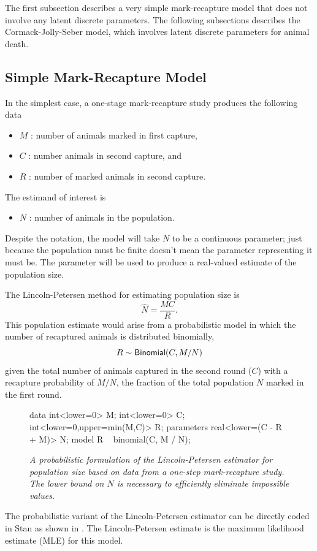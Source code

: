 The first subsection describes a very simple mark-recapture model that does
not involve any latent discrete parameters.  The following subsections
describes the Cormack-Jolly-Seber model, which involves latent
discrete parameters for animal death.

\subsection{Simple Mark-Recapture Model}

In the simplest case, a one-stage mark-recapture study produces the
following data
%
\begin{itemize}
\item $M$ : number of animals marked in first capture,
\item $C$ : number animals in second capture, and
\item $R$ : number of marked animals in second capture.
\end{itemize}
%
The estimand of interest is
%
\begin{itemize}
\item $N$ : number of animals in the population.
\end{itemize}
%
Despite the notation, the model will take $N$ to be a continuous
parameter; just because the population must be finite doesn't mean the
parameter representing it must be.  The parameter will be used to
produce a real-valued estimate of the population size.

The Lincoln-Petersen \citep{Lincoln:1930,Petersen:1896} method for
estimating population size is
%
\[
\hat{N} = \frac{M C}{R}.
\]
%
This population estimate would arise from a probabilistic model in
which the number of recaptured animals is distributed binomially,
\[
R \sim \distro{Binomial}(C, M / N)
\]
given the total number of animals captured in the second round ($C$)
with a recapture probability of $M/N$, the fraction of the total
population $N$ marked in the first round.

%
\begin{figure}
\begin{stancode}
data {
  int<lower=0> M;
  int<lower=0> C;
  int<lower=0,upper=min(M,C)> R;
}
parameters {
  real<lower=(C - R + M)> N;
}
model {
  R ~ binomial(C, M / N);
}
\end{stancode}
\vspace*{-6pt}
\caption{\small\it A probabilistic formulation of the Lincoln-Petersen
estimator for population size based on data from a one-step
mark-recapture study.  The lower bound on $N$ is necessary to
efficiently eliminate impossible values.}%
\label{lincoln-petersen-model.figure}
\end{figure}
%
The probabilistic variant of the Lincoln-Petersen estimator can be
directly coded in Stan as shown in .
The Lincoln-Petersen estimate is the maximum likelihood estimate (MLE)
for this model.

